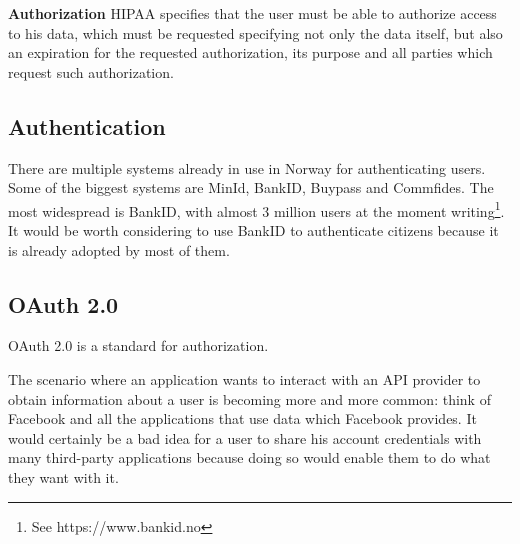 \textbf{Authorization}\newline
HIPAA specifies that the user must be able to authorize access to his data,
which must be requested specifying not only the data itself, but also
an expiration for the requested authorization, its purpose and all parties
which request such authorization.

\subsection{Authentication}

There are multiple systems already in use in Norway for authenticating users. 
Some of the biggest systems are MinId, BankID, Buypass and Commfides.
The most widespread is BankID, with almost 3 million users at the moment
writing\footnote{See https://www.bankid.no}.
It would be worth considering to use BankID to authenticate citizens because
it is already adopted by most of them.


\subsection{OAuth 2.0}

OAuth 2.0\cite{OAuth} is a standard for authorization. %


The scenario where an application wants to interact with an API provider to obtain information
about a user is becoming more and more common: think of Facebook and all the applications that use data
which Facebook provides. It would certainly be a bad idea for a user to share his account credentials
with many third-party applications because doing so would enable them to do what they want with it.

